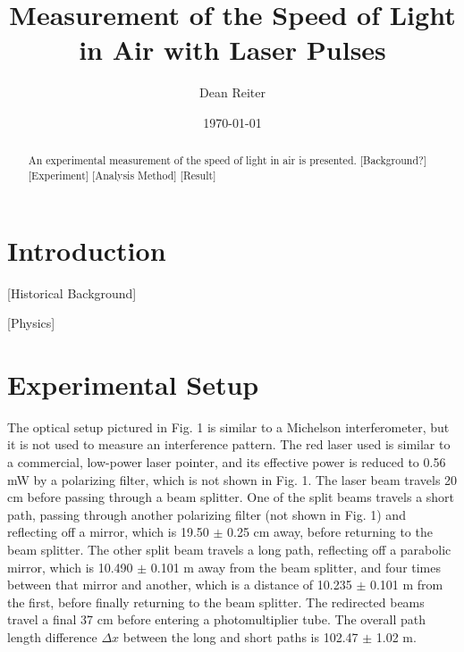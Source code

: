 \documentclass[%
 reprint,
 amsmath,amssymb,
 aps,
]{revtex4-2}
\begin{document}

\title{Measurement of the Speed of Light in Air with Laser Pulses}%

\author{Dean Reiter}
%

\date{\today}%

\begin{abstract}
An experimental measurement of the speed of light in air is presented. [Background?] [Experiment] [Analysis Method] [Result]

\end{abstract}

\maketitle


\section{Introduction}

[Historical Background]

[Physics]

\section{Experimental Setup}

The optical setup pictured in Fig. 1 is similar to a Michelson interferometer, but it is not used to measure an interference pattern. The red laser used is similar to a commercial, low-power laser pointer, and its effective power is reduced to 0.56 mW by a polarizing filter, which is not shown in Fig. 1. The laser beam travels 20 cm before passing through a beam splitter. One of the split beams travels a short path, passing through another polarizing filter (not shown in Fig. 1) and reflecting off a mirror, which is 19.50 $\pm$ 0.25 cm away, before returning to the beam splitter. The other split beam travels a long path, reflecting off a parabolic mirror, which is 10.490 $\pm$ 0.101 m away from the beam splitter, and four times between that mirror and another, which is a distance of 10.235 $\pm$ 0.101 m from the first, before finally returning to the beam splitter. The redirected beams travel a final 37 cm before entering a photomultiplier tube. The overall path length difference $\Delta x$ between the long and short paths is 102.47 $\pm$ 1.02 m. 
\end{document}
